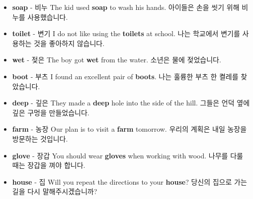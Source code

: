 \documentclass{article}
\begin{document}
\begin{addmargin}[1em]{1em}
\begin{itemize}
        \item \fontsize{12pt}{14pt}\selectfont \textbf{soap} - 비누 \newline
        The kid used \textbf{soap} to wash his hands. \newline
        아이들은 손을 씻기 위해 비누를 사용했습니다.
        
        \item \fontsize{12pt}{14pt}\selectfont \textbf{toilet} - 변기 \newline
        I do not like using the \textbf{toilets} at school. \newline
        나는 학교에서 변기를 사용하는 것을 좋아하지 않습니다.
        
        \item \fontsize{12pt}{14pt}\selectfont \textbf{wet} - 젖은 \newline
        The boy got \textbf{wet} from the water. \newline
        소년은 물에 젖었습니다.
        
        \item \fontsize{12pt}{14pt}\selectfont \textbf{boot} - 부츠 \newline
        I found an excellent pair of \textbf{boots}. \newline
        나는 훌륭한 부츠 한 켤레를 찾았습니다.
        
        \item \fontsize{12pt}{14pt}\selectfont \textbf{deep} - 깊은 \newline
        They made a \textbf{deep} hole into the side of the hill. \newline
        그들은 언덕 옆에 깊은 구멍을 만들었습니다.
        
        \item \fontsize{12pt}{14pt}\selectfont \textbf{farm} - 농장 \newline
        Our plan is to visit a \textbf{farm} tomorrow. \newline
        우리의 계획은 내일 농장을 방문하는 것입니다.
        
        \item \fontsize{12pt}{14pt}\selectfont \textbf{glove} - 장갑 \newline
        You should wear \textbf{gloves} when working with wood. \newline
        나무를 다룰 때는 장갑을 껴야 합니다.
        
        \item \fontsize{12pt}{14pt}\selectfont \textbf{house} - 집 \newline
        Will you repeat the directions to your \textbf{house}? \newline
        당신의 집으로 가는 길을 다시 말해주시겠습니까?
        

\end{itemize}
\end{addmargin}
\end{document}
